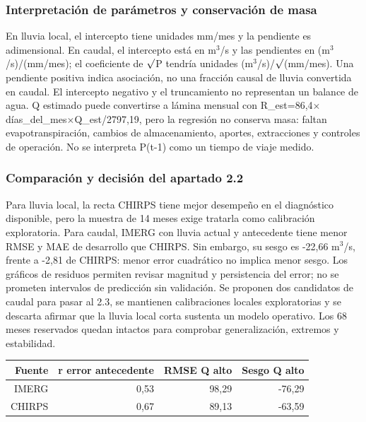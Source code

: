 \subsubsection*{Interpretación de parámetros y conservación de masa}
En lluvia local, el intercepto tiene unidades mm/mes y la pendiente es adimensional. En caudal, el intercepto está en m$^3$/s y las pendientes en (m$^3$/s)/(mm/mes); el coeficiente de $\sqrt{\vphantom{P}}$P tendría unidades (m$^3$/s)/$\sqrt{\vphantom{P}}$(mm/mes). Una pendiente positiva indica asociación, no una fracción causal de lluvia convertida en caudal. El intercepto negativo y el truncamiento no representan un balance de agua. Q estimado puede convertirse a lámina mensual con R\_est=86,4$\times$días\_del\_mes$\times$Q\_est/2797,19, pero la regresión no conserva masa: faltan evapotranspiración, cambios de almacenamiento, aportes, extracciones y controles de operación. No se interpreta P(t-1) como un tiempo de viaje medido.
\subsubsection*{Comparación y decisión del apartado 2.2}
Para lluvia local, la recta CHIRPS tiene mejor desempeño en el diagnóstico disponible, pero la muestra de 14 meses exige tratarla como calibración exploratoria. Para caudal, IMERG con lluvia actual y antecedente tiene menor RMSE y MAE de desarrollo que CHIRPS. Sin embargo, su sesgo es -22,66 m$^3$/s, frente a -2,81 de CHIRPS: menor error cuadrático no implica menor sesgo. Los gráficos de residuos permiten revisar magnitud y persistencia del error; no se prometen intervalos de predicción sin validación. Se proponen dos candidatos de caudal para pasar al 2.3, se mantienen calibraciones locales exploratorias y se descarta afirmar que la lluvia local corta sustenta un modelo operativo. Los 68 meses reservados quedan intactos para comprobar generalización, extremos y estabilidad.
\begin{center}\small\begin{tabular}{rrrr}\hline
Fuente & r error antecedente & RMSE Q alto & Sesgo Q alto \\ \hline
IMERG & 0,53 & 98,29 & -76,29 \\
CHIRPS & 0,67 & 89,13 & -63,59 \\
\hline\end{tabular}\end{center}
